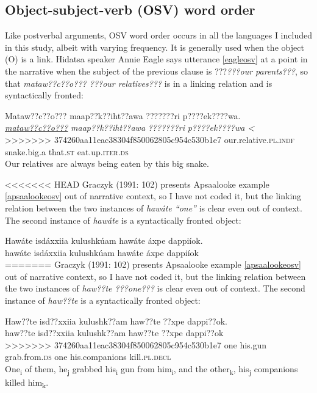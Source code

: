 \documentclass[output=paper]{LSP/langsci}
\begin{document}
\subsection{Object-subject-verb (OSV) word order}\label{osv}

Like postverbal arguments, OSV word order occurs in all the languages I included in this study, albeit with varying frequency. It is generally used when the object (O) is a link. Hidatsa speaker Annie Eagle says utterance \ref{eagleosv} at a point in the narrative when the subject of the previous clause is ???\emph{???our parents???}, so that \emph{mataw??c??o??? ???our relatives???} is in a linking relation and is syntactically fronted:

\ea\label{eagleosv}
Mataw??c??o??? maap??k??iht??awa ???????ri p????ek????wa.\footnotemark\\
\gll	\emph{\underline{mataw??c??o???}}		\emph{maap??k??iht??awa} 	\emph{???????ri} 	\emph{p????ek????wa <}\\
>>>>>>> 374260aa11eac38304f850062805c954c530b1e7
	our.relative.\textsc{pl.indf} 		snake.big.a 			that.\textsc{st} 	eat.up.\textsc{iter.ds}\\
\glt	Our relatives are always being eaten by this big snake.
\z

<<<<<<< HEAD
Graczyk (1991: 102) presents Apsaalooke example \ref{apsaalookeosv} out of narrative context, so I have not coded it, but the linking relation between the two instances of \emph{hawáte “one”} is clear even out of context. The second instance of \emph{hawáte} is a syntactically fronted object:

\ea\label{apsaalookeosv}
	Hawáte isdáxxiia kulushkúam hawáte áxpe dappiíok.\\
\gll	hawáte 	isdáxxiia 	kulushkúam			hawáte 	áxpe 			dappiíok\\
=======
Graczyk (1991: 102) presents Apsaalooke example \ref{apsaalookeosv} out of narrative context, so I have not coded it, but the linking relation between the two instances of \emph{haw??te ???one???} is clear even out of context. The second instance of \emph{haw??te} is a syntactically fronted object:

\ea\label{apsaalookeosv}
	Haw??te isd??xxiia kulushk??am haw??te ??xpe dappi??ok.\\
\gll	haw??te 	isd??xxiia 	kulushk??am			haw??te 	??xpe 			dappi??ok\\
>>>>>>> 374260aa11eac38304f850062805c954c530b1e7
	one 		his.gun 	grab.from.\textsc{ds} 	one 		his.companions	kill.\textsc{pl.decl}\\
\glt	One\textsubscript{i} of them, he\textsubscript{j} grabbed his\textsubscript{i} gun from him\textsubscript{i}, and the other\textsubscript{k}, his\textsubscript{j} companions killed him\textsubscript{k}.
\z
\end{document}
